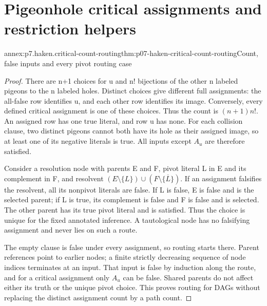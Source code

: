 \section{Pigeonhole critical assignments and restriction helpers}

\begin{annexitem}{annex:p7.haken.critical-count-routing}{thm:p07-haken-critical-count-routing}{Count, false inputs and every pivot routing case}
\begin{proof}
There are n+1 choices for u and n! bijections of the other
n labeled pigeons to the n labeled holes. Distinct choices
give different full assignments: the all-false row identifies
u, and each other row identifies its image. Conversely, every
defined critical assignment is one of these choices. Thus the
count is \((n+1)n!\). An assigned row has one true literal,
and row u has none. For each collision clause, two distinct
pigeons cannot both have its hole as their assigned image,
so at least one of its negative literals is true. All inputs
except \(A_u\) are therefore satisfied.

Consider a resolution node with parents E and F, pivot literal
L in E and its complement in F, and resolvent
\((E\setminus\{L\})\cup(F\setminus\{\overline L\})\).
If an assignment falsifies the resolvent, all its nonpivot
literals are false. If L is false, E is false and is the
selected parent; if L is true, its complement is false and
F is false and is selected. The other parent has its true
pivot literal and is satisfied. Thus the choice is unique
for the fixed annotated inference. A tautological node has
no falsifying assignment and never lies on such a route.

The empty clause is false under every assignment, so routing
starts there. Parent references point to earlier nodes; a
finite strictly decreasing sequence of node indices terminates
at an input. That input is false by induction along the route,
and for a critical assignment only \(A_u\) can be false.
Shared parents do not affect either its truth or the unique
pivot choice. This proves routing for DAGs without replacing
the distinct assignment count by a path count.
\end{proof}
\end{annexitem}


